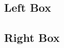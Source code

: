 \documentclass[a4paper, 11pt]{article}
\let \oldsection \section
\renewcommand{\section}{\vspace{-15pt}\oldsection}
\begin{document}
\begin{twocolumnlayout}
  \begin{posterblock}
    \section*{Left Box}
    \lipsum[6]
  \end{posterblock}

  \begin{posterblock}
    \section*{Right Box}
    \lipsum[10]
  \end{posterblock}
\end{twocolumnlayout}

\begin{logobox}[mylogobox]
  \centering
  \hfill
  \hfill
  \hfill
\end{logobox}
\end{document}

